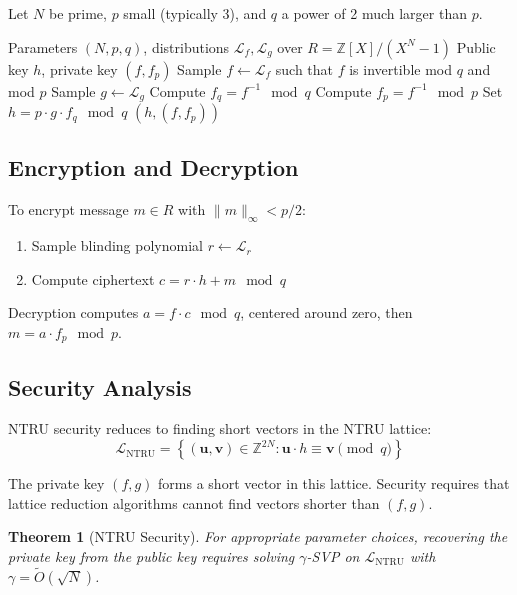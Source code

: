 \documentclass[11pt,a4paper]{article}
\newtheorem{theorem}{Theorem}[section]
\begin{document}
Let $N$ be prime, $p$ small (typically 3), and $q$ a power of 2 much larger than $p$.

\begin{algorithm}
\caption{NTRU Key Generation}
\begin{algorithmic}[1]
\Require Parameters $(N, p, q)$, distributions $\mathcal{L}_f, \mathcal{L}_g$ over $R = \mathbb{Z}[X]/(X^N - 1)$
\Ensure Public key $h$, private key $(f, f_p)$
\State Sample $f \leftarrow \mathcal{L}_f$ such that $f$ is invertible mod $q$ and mod $p$
\State Sample $g \leftarrow \mathcal{L}_g$
\State Compute $f_q = f^{-1} \mod q$
\State Compute $f_p = f^{-1} \mod p$
\State Set $h = p \cdot g \cdot f_q \mod q$
\State \Return $(h, (f, f_p))$
\end{algorithmic}
\end{algorithm}

\subsection{Encryption and Decryption}

To encrypt message $m \in R$ with $\|m\|_\infty < p/2$:
\begin{enumerate}
    \item Sample blinding polynomial $r \leftarrow \mathcal{L}_r$
    \item Compute ciphertext $c = r \cdot h + m \mod q$
\end{enumerate}

Decryption computes $a = f \cdot c \mod q$, centered around zero, then $m = a \cdot f_p \mod p$.

\subsection{Security Analysis}

NTRU security reduces to finding short vectors in the NTRU lattice:
\[
\mathcal{L}_{\text{NTRU}} = \left\{ (\mathbf{u}, \mathbf{v}) \in \mathbb{Z}^{2N} : \mathbf{u} \cdot h \equiv \mathbf{v} \pmod{q} \right\}
\]

The private key $(f, g)$ forms a short vector in this lattice. Security requires that lattice reduction algorithms cannot find vectors shorter than $(f, g)$.

\begin{theorem}[NTRU Security]
For appropriate parameter choices, recovering the private key from the public key requires solving $\gamma$-SVP on $\mathcal{L}_{\text{NTRU}}$ with $\gamma = \tilde{O}(\sqrt{N})$.
\end{theorem}
\end{document}
